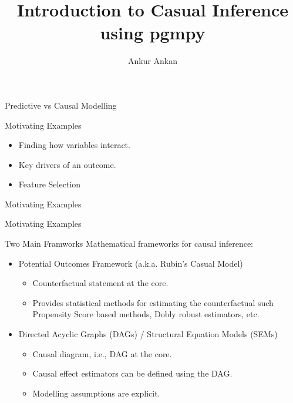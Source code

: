 \documentclass{beamer}
\begin{document}
\title[Causal Inference using pgmpy]{Introduction to Casual Inference using pgmpy}
\author{Ankur Ankan}
\date{}

\maketitle

\begin{frame}{Predictive vs Causal Modelling}
\end{frame}

\begin{frame}{Motivating Examples}
	\begin{itemize}
		\item Finding how variables interact.
		\item Key drivers of an outcome.
		\item Feature Selection
	\end{itemize}
\end{frame}

\begin{frame}{Motivating Examples}
\end{frame}

\begin{frame}{Motivating Examples}
\end{frame}

\begin{frame}{Two Main Framworks}
	Mathematical frameworks for causal inference:
	\vspace{0.5em}
	\begin{itemize}
		\item Potential Outcomes Framework (a.k.a. Rubin's Casual Model)
			\begin{itemize}
				\item Counterfactual statement at the core.
				\item Provides statistical methods for estimating the counterfactual such Propensity Score based methods, Dobly robust estimators, etc.
			\end{itemize}
	\end{itemize}
	\vspace{2em}
	\begin{itemize}
		\item Directed Acyclic Graphs (DAGs) / Structural Equation Models (SEMs)
			\begin{itemize}
				\item Causal diagram, i.e., DAG at the core.
				\item Causal effect estimators can be defined using the DAG.
				\item Modelling assumptions are explicit.
			\end{itemize}
	\end{itemize}
\end{frame}
\end{document}
